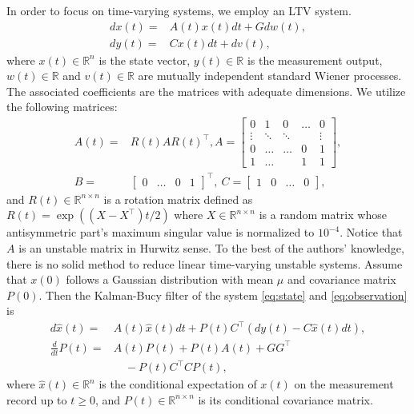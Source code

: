\documentclass[fleqn,10pt]{SICE_FES26}
\begin{document}
In order to focus on time-varying systems, we employ an LTV system.  
\begin{align}
dx(t) =& A(t) x(t) dt + Gdw(t), \label{eq:state} 
\\ 
dy(t) =& Cx(t) dt + dv(t), \label{eq:observation}
\end{align}
where $x(t) \in {\mathbb{R}}^{n}$ is the state vector, $y(t) \in \mathbb{R}$ is the measurement output, $w(t) \in \mathbb{R}$ and $v(t) \in \mathbb{R}$ are mutually independent standard Wiener processes. The associated coefficients are the matrices with adequate dimensions. We utilize the following matrices:
\begin{align*}
A (t) =& R(t) A R(t)^{\top}, A = \begin{bmatrix}
0 & 1 & 0 & \dots & 0 \\
\vdots & \ddots & \ddots & & \vdots \\
0 & \dots  & \dots & 0 & 1 \\
1 & \dots &  & 1 & 1
\end{bmatrix}
,\\
B =& \begin{bmatrix} 0 &\dots &0 & 1\end{bmatrix}^{\top} , 
\
C = \begin{bmatrix} 1 & 0 &\dots &0\end{bmatrix},
\end{align*}
and $R(t) \in {\mathbb{R}}^{n\times n}$ is a rotation matrix defined as $R(t) = \exp ( (X - X^{\top}) t/2)$ where $X \in {\mathbb{R}}^{n\times n}$ is a random matrix whose antisymmetric part's maximum singular value is normalized to $10^{-4}$.  
Notice that $A$ is an unstable matrix in Hurwitz sense. 
To the best of the authors' knowledge, there is no solid method to reduce linear time-varying unstable systems. 
Assume that $x(0)$ follows a Gaussian distribution with mean $\mu$ and covariance matrix $P(0)$. 
Then the Kalman-Bucy filter of the system \eqref{eq:state} and \eqref{eq:observation} is 
\begin{align}
d\hat{x} (t) = & A(t) \hat{x}(t) dt + P(t) C^{\top} (dy(t) - C\hat{x}(t) dt),
\\
\frac{d}{dt}P(t) =& A(t) P(t) + P(t) A(t) + GG^{\top} \nonumber 
\\ & \quad - P(t) C^{\top}C P(t),
\end{align}
where $\hat{x}(t) \in {\mathbb{R}}^{n}$ is the conditional expectation of $x(t)$ on the measurement record up to $t\geq 0$, and $P(t) \in {\mathbb{R}}^{n\times n}$ is its conditional covariance matrix. 
\end{document}

